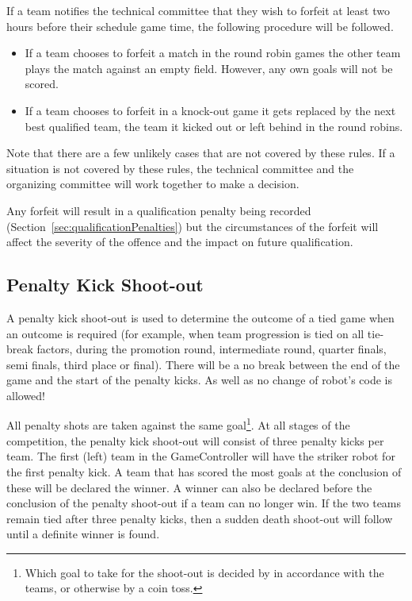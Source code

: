 If a team notifies the technical committee that they wish to forfeit at least two hours before their schedule game time, the following procedure will be followed.

\begin{itemize}
  \item If a team chooses to forfeit a match in the round robin games the other team plays the match against an empty field.  However, any own goals will not be scored.
  \item If a team chooses to forfeit in a knock-out game it gets replaced by the next best qualified team, \ie the team it kicked out or left behind in the round robins.
\end{itemize}

Note that there are a few unlikely cases that are not covered by these rules.  If a situation is not covered by these rules, the technical committee and the organizing committee will work together to make a decision.

Any forfeit will result in a qualification penalty being recorded (\cf Section~\ref{sec:qualificationPenalties}) but the circumstances of the forfeit will affect the severity of the offence and the impact on future qualification.

\subsection{Penalty Kick Shoot-out}
\label{sec:penalty_shoot-out}

A penalty kick shoot-out is used to determine the outcome of a tied game when an outcome is required (for example, when team progression is tied on all tie-break factors, during the promotion round, intermediate round, quarter finals, semi finals, third place or final).
There will be a no break between the end of the game and the start of the penalty kicks. As well as no change of robot's code is allowed!

All penalty shots are taken against the same goal\footnote{Which goal to take for the shoot-out is decided by in accordance with the teams, or otherwise by a coin toss.}.
At all stages of the competition, the penalty kick shoot-out will consist of three penalty kicks per team.
The first (left) team in the GameController will have the striker robot for the first penalty kick.
A team that has scored the most goals at the conclusion of these will be declared the winner. A winner can also be declared before the conclusion of the penalty shoot-out if a team can no longer win. If the two teams remain tied after three penalty kicks, then a sudden death shoot-out will follow until a definite winner is found.


